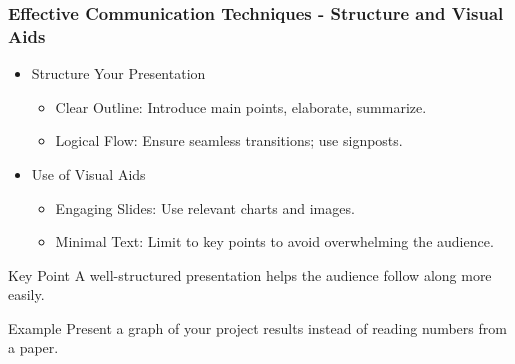 \documentclass{beamer}
\begin{document}
\begin{frame}[fragile]
    \frametitle{Effective Communication Techniques - Structure and Visual Aids}
    
    \begin{itemize}
        \item Structure Your Presentation
        \begin{itemize}
            \item Clear Outline: Introduce main points, elaborate, summarize.
            \item Logical Flow: Ensure seamless transitions; use signposts.
        \end{itemize}
        
        \item Use of Visual Aids
        \begin{itemize}
            \item Engaging Slides: Use relevant charts and images.
            \item Minimal Text: Limit to key points to avoid overwhelming the audience.
        \end{itemize}
    \end{itemize}
    
    \begin{block}{Key Point}
        A well-structured presentation helps the audience follow along more easily.
    \end{block}
    
    \begin{block}{Example}
        Present a graph of your project results instead of reading numbers from a paper.
    \end{block}
\end{frame}
\end{document}
